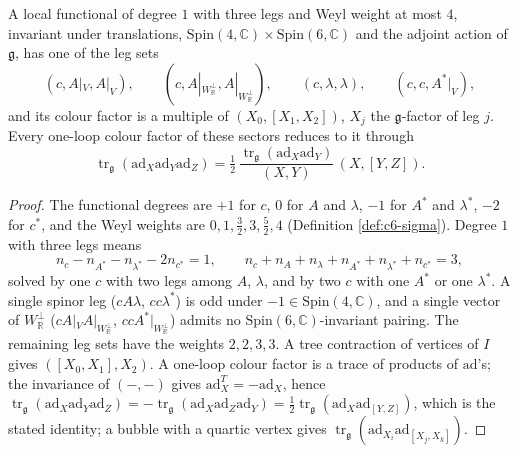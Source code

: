 \begin{lemma}
\label{lem:c9-legs}
A local functional of degree $1$ with three legs and Weyl weight at most $4$, invariant under translations, $\mathrm{Spin}(4,\mathbb C)\times\mathrm{Spin}(6,\mathbb C)$ and the adjoint action of $\mathfrak g$, has one of the leg sets
\[
(c,A|_V,A|_V),\qquad(c,A|_{W_{\mathbb R}^\perp},A|_{W_{\mathbb R}^\perp}),\qquad(c,\lambda,\lambda),\qquad(c,c,A^*|_V),
\]
and its colour factor is a multiple of $(X_0,[X_1,X_2])$, $X_j$ the $\mathfrak g$-factor of leg $j$. Every one-loop colour factor of these sectors reduces to it through
\[
\operatorname{tr}_{\mathfrak g}(\mathrm{ad}_X\mathrm{ad}_Y\mathrm{ad}_Z)=\tfrac12\,\frac{\operatorname{tr}_{\mathfrak g}(\mathrm{ad}_X\mathrm{ad}_Y)}{(X,Y)}\,(X,[Y,Z]) .
\]
\end{lemma}

\begin{proof}
The functional degrees are $+1$ for $c$, $0$ for $A$ and $\lambda$, $-1$ for $A^*$ and $\lambda^*$, $-2$ for $c^*$, and the Weyl weights are $0,1,\tfrac32,3,\tfrac52,4$ (Definition \ref{def:c6-sigma}). Degree $1$ with three legs means
\[
n_c-n_{A^*}-n_{\lambda^*}-2n_{c^*}=1,\qquad n_c+n_A+n_\lambda+n_{A^*}+n_{\lambda^*}+n_{c^*}=3,
\]
solved by one $c$ with two legs among $A$, $\lambda$, and by two $c$ with one $A^*$ or one $\lambda^*$. A single spinor leg ($cA\lambda$, $cc\lambda^*$) is odd under $-1\in\mathrm{Spin}(4,\mathbb C)$, and a single vector of $W_{\mathbb R}^\perp$ ($cA|_VA|_{W_{\mathbb R}^\perp}$, $ccA^*|_{W_{\mathbb R}^\perp}$) admits no $\mathrm{Spin}(6,\mathbb C)$-invariant pairing. The remaining leg sets have the weights $2,2,3,3$. A tree contraction of vertices of $I$ gives $([X_0,X_1],X_2)$. A one-loop colour factor is a trace of products of $\mathrm{ad}$'s; the invariance of $(-,-)$ gives $\mathrm{ad}_X^{T}=-\mathrm{ad}_X$, hence $\operatorname{tr}_{\mathfrak g}(\mathrm{ad}_X\mathrm{ad}_Y\mathrm{ad}_Z)=-\operatorname{tr}_{\mathfrak g}(\mathrm{ad}_X\mathrm{ad}_Z\mathrm{ad}_Y)=\tfrac12\operatorname{tr}_{\mathfrak g}(\mathrm{ad}_X\mathrm{ad}_{[Y,Z]})$, which is the stated identity; a bubble with a quartic vertex gives $\operatorname{tr}_{\mathfrak g}(\mathrm{ad}_{X_i}\mathrm{ad}_{[X_j,X_k]})$.
\end{proof}


